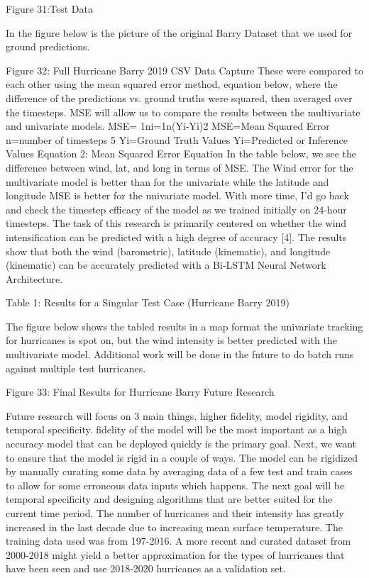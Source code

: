 \documentclass{article}
\begin{document}
Figure 31:Test Data








In the figure below is the picture of the original Barry Dataset that we used for ground predictions.


Figure 32: Full Hurricane Barry 2019 CSV Data Capture
These were compared to each other using the mean squared error method, equation below, where the difference of the predictions vs. ground truths were squared, then averaged over the timesteps. MSE will allow us to compare the results between the multivariate and univariate models.
MSE= 1ni=1n(Yi-Yi)2
MSE=Mean Squared Error
n=number of timesteps 5
Yi=Ground Truth Values
Yi=Predicted or Inference Values
Equation 2: Mean Squared Error Equation
In the table below, we see the difference between wind, lat, and long in terms of MSE. The Wind error for the multivariate model is better than for the univariate while the latitude and longitude MSE is better for the univariate model. With more time, I’d go back and check the timestep efficacy of the model as we trained initially on 24-hour timesteps. The task of this research is primarily centered on whether the wind intensification can be predicted with a high degree of accuracy [4]. The results show that both the wind (barometric), latitude (kinematic), and longitude (kinematic) can be accurately predicted with a Bi-LSTM Neural Network Architecture.

Table 1: Results for a Singular Test Case (Hurricane Barry 2019)


The figure below shows the tabled results in a map format the univariate tracking for hurricanes is spot on, but the wind intensity is better predicted with the multivariate model. Additional work will be done in the future to do batch runs against multiple test hurricanes. 


Figure 33: Final Results for Hurricane Barry
Future Research

Future research will focus on 3 main things, higher fidelity, model rigidity, and temporal specificity. fidelity of the model will be the most important as a high accuracy model that can be deployed quickly is the primary goal. Next, we want to ensure that the model is rigid in a couple of ways. The model can be rigidized by manually curating some data by averaging data of a few test and train cases to allow for some erroneous data inputs which happens. The next goal will be temporal specificity and designing algorithms that are better suited for the current time period. The number of hurricanes and their intensity has greatly increased in the last decade due to increasing mean surface temperature. The training data used was from 197-2016. A more recent and curated dataset from 2000-2018 might yield a better approximation for the types of hurricanes that have been seen and use 2018-2020 hurricanes as a validation set. 
\end{document}
